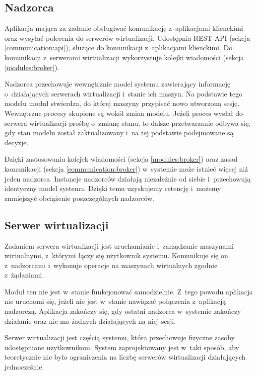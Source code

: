 \documentclass[../opis-rozwiazania.tex]{subfiles}
\begin{document}
\subsection{Nadzorca}
\label{modules:overseer}

Aplikacja mająca za zadanie obsługiwać komunikację z~aplikacjami klienckimi oraz wysyłać polecenia do serwerów wirtualizacji.
Udostępnia REST API (sekcja \ref{communication:api}), służące do komunikacji z~aplikacjami klienckimi.
Do komunikacji z~serwerami wirtualizacji wykorzystuje kolejki wiadomości (sekcja \ref{modules:broker}).

Nadzorca przechowuje wewnętrznie model systemu zawierający informację o~działających serwerach wirtualizacji i~stanie ich maszyn. Na podstawie tego modelu moduł stwierdza, do której maszyny przypisać nowo utworzoną sesję. Wewnętrzne procesy skupione są wokół zmian modelu. Jeżeli proces wysłał do serwera wirtualizacji prośbę o~zmianę stanu, to dalsze przetwarzanie odbywa się, gdy stan modelu został zaktualizowany i~na tej podstawie podejmowane są decyzje.

Dzięki zastosowaniu kolejek wiadomości (sekcja \ref{modules:broker}) oraz zasad komunikacji (sekcja \ref{communication:broker}) w~systemie może istnieć więcej niż jeden nadzorca. Instancje nadzorców działają niezależnie od siebie i~przechowują identyczny model systemu. Dzięki temu uzyskujemy retencję i~możemy zmniejszyć obciążenie poszczególnych nadzorców.

\subsection{Serwer wirtualizacji}
\label{modules:virtsrv}

Zadaniem serwera wirtualizacji jest uruchamianie i~zarządzanie maszynami wirtualnymi, z~którymi łączy się użytkownik systemu. Komunikuje się on z~nadzorcami i~wykonuje operacje na maszynach wirtualnych zgodnie z~żądaniami.

Moduł ten nie jest w~stanie funkcjonować samodzielnie. Z~tego powodu aplikacja nie uruchomi się, jeżeli nie jest w~stanie nawiązać połączenia z~aplikacją nadzorczą. Aplikacja zakończy się, gdy ostatni nadzorca w~systemie zakończy działanie oraz nie ma żadnych działających na niej sesji.

Serwer wirtualizacji jest częścią systemu, która przechowuje fizyczne zasoby udostępniane użytkownikom.
System zaprojektowany jest w~taki sposób, aby teoretycznie nie było ograniczenia na liczbę serwerów wirtualizacji działających jednocześnie.
\end{document}
